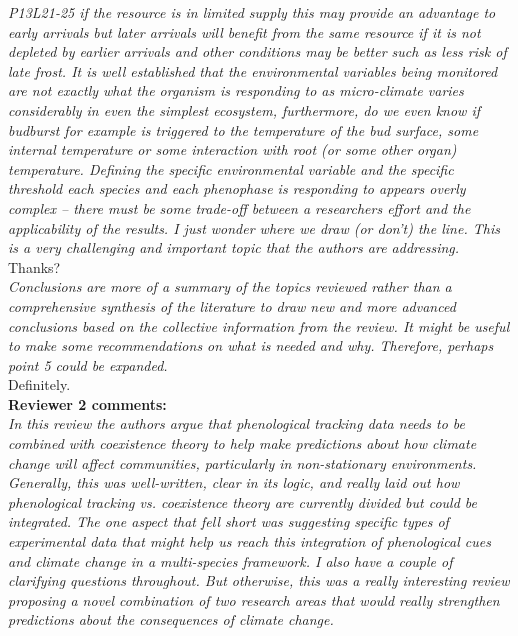 \documentclass[11pt]{article}
\begin{document}
\emph{P13L21-25 if the resource is in limited supply this may provide an advantage to
early arrivals but later arrivals will benefit from the same resource if it is not depleted
by earlier arrivals and other conditions may be better such as less risk of late frost.
It is well established that the environmental variables being monitored are not exactly what
the organism is responding to as micro-climate varies considerably in even the simplest
ecosystem, furthermore, do we even know if budburst for example is triggered to the
temperature of the bud surface, some internal temperature or some interaction with root (or
some other organ) temperature. Defining the specific environmental variable and the specific
threshold each species and each phenophase is responding to appears overly complex – there
must be some trade-off between a researchers effort and the applicability of the results. I
just wonder where we draw (or don't) the line. This is a very challenging and important topic
that the authors are addressing.}\\

Thanks?\\

\emph{Conclusions are more of a summary of the topics reviewed rather than a comprehensive
synthesis of the literature to draw new and more advanced conclusions based on the collective
information from the review. It might be useful to make some recommendations on what is
needed and why. Therefore, perhaps point 5 could be expanded.}\\

Definitely. \\

{\bf Reviewer 2 comments:} \\

\emph{In this review the authors argue that phenological tracking data needs to be combined with
coexistence theory to help make predictions about how climate change will affect communities,
particularly in non-stationary environments. Generally, this was well-written, clear in its
logic, and really laid out how phenological tracking vs. coexistence theory are currently
divided but could be integrated. The one aspect that fell short was suggesting specific types
of experimental data that might help us reach this integration of phenological cues and
climate change in a multi-species framework. I also have a couple of clarifying questions
throughout. But otherwise, this was a really interesting review proposing a novel combination
of two research areas that would really strengthen predictions about the consequences of
climate change.}\\
\end{document}
